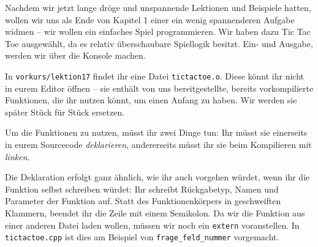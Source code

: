 
Nachdem wir jetzt lange dröge und unspannende Lektionen und Beispiele hatten, wollen wir uns als Ende von
Kapitel 1 einer ein wenig spannenderen Aufgabe widmen -- wir wollen ein
einfaches Spiel programmieren. Wir haben dazu Tic Tac Toe ausgewählt, da es
relativ überschaubare Spiellogik besitzt. Ein- und Ausgabe, werden wir über die
Konsole machen.

In \texttt{vorkurs/lektion17} findet ihr eine Datei \texttt{tictactoe.o}. Diese
könnt ihr nicht in eurem Editor öffnen -- sie enthält von uns bereitgestellte,
bereits vorkompilierte Funktionen, die ihr nutzen könnt, um einen Anfang zu
haben. Wir werden sie später Stück für Stück ersetzen.

Um die Funktionen zu nutzen, müsst ihr zwei Dinge tun: Ihr müsst sie einerseits
in eurem Sourcecode \emph{deklarieren}, andererseits müsst ihr sie beim
Kompilieren mit \emph{linken}.

Die Deklaration erfolgt ganz ähnlich, wie ihr auch vorgehen würdet, wenn ihr
die Funktion selbst schreiben würdet: Ihr schreibt Rückgabetyp, Namen und
Parameter der Funktion auf. Statt des Funktionenkörpers in geschweiften
Klammern, beendet ihr die Zeile mit einem Semikolon. Da wir die Funktion aus
einer anderen Datei laden wollen, müssen wir noch ein \texttt{extern}
voranstellen. In \texttt{tictactoe.cpp} ist dies am Beispiel von
\texttt{frage\_feld\_nummer} vorgemacht.

